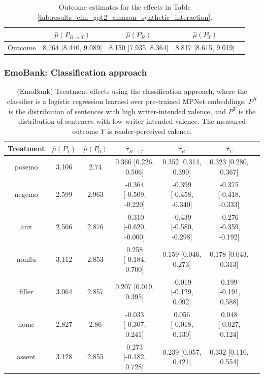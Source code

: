 \documentclass{article}
\begin{document}
\begin{table}[!ht]
    \centering
    \begin{tabular}{c|cccc}
\toprule
    & $\hat{\mu}(P_{R \rightarrow T})$   & $\hat{\mu}(P_R)$     & $\hat{\mu}(P_T)$     \\
\midrule
    Outcome & 8.764 [8.440, 9.089]               & 8.150 [7.935, 8.364] & 8.817 [8.615, 9.019] \\
\bottomrule
    \end{tabular}
    \caption{Outcome estimates for the effects in Table \ref{tab:results_clm_gpt2_amazon_synthetic_interaction}.}
    \label{tab:results_clm_gpt2_amazon_synthetic_interaction_outcome}
\end{table}

\newpage
\subsubsection{EmoBank: Classification approach}

\begin{table}[!ht]
\centering
\begin{tabular}{c|cccccc}
\toprule
    Treatment   &   $\hat{\mu}(P_1)$ &   $\hat{\mu}(P_0)$ & $\hat{\tau}_{R \rightarrow T}$   & $\hat{\tau}_R$          & $\hat{\tau}_T$          \\
\midrule
    posemo      &              3.106 &              2.74  & 0.366 [0.226, 0.506]             & 0.352 [0.314, 0.390]    & 0.323 [0.280, 0.367]    \\
    negemo      &              2.599 &              2.963 & -0.364 [-0.509, -0.220]          & -0.399 [-0.458, -0.340] & -0.375 [-0.418, -0.333] \\
    anx         &              2.566 &              2.876 & -0.310 [-0.620, -0.000]          & -0.439 [-0.580, -0.298] & -0.276 [-0.359, -0.192] \\
    nonflu      &              3.112 &              2.853 & 0.258 [-0.184, 0.700]            & 0.159 [0.046, 0.273]    & 0.178 [0.043, 0.313]    \\
    filler      &              3.064 &              2.857 & 0.207 [0.019, 0.395]             & -0.019 [-0.129, 0.092]  & 0.199 [-0.191, 0.588]   \\
    home        &              2.827 &              2.86  & -0.033 [-0.307, 0.241]           & 0.056 [-0.018, 0.130]   & 0.048 [-0.027, 0.124]   \\
    assent      &              3.128 &              2.855 & 0.273 [-0.182, 0.728]            & 0.239 [0.057, 0.421]    & 0.332 [0.110, 0.554]    \\
\bottomrule
\end{tabular}
\caption{(EmoBank) Treatment effects using the classification approach, where the classifier is a logistic regression learned over pre-trained MPNet embeddings. $P^R$ is the distribution of sentences with high writer-intended valence, and $P^T$ is the distribution of sentences with low writer-intended valence. The measured outcome $Y$ is reader-perceived valence.}
\label{tab:results_clf_mpnet_emobank}
\end{table}
\end{document}
